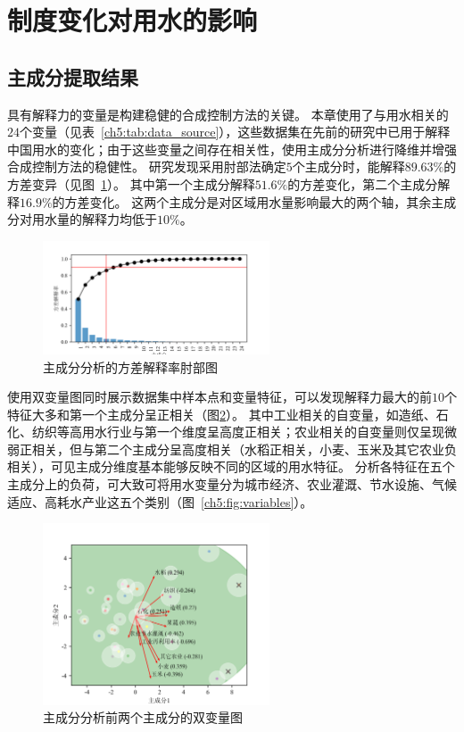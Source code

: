 

\section{制度变化对用水的影响}

\subsection{主成分提取结果}

具有解释力的变量是构建稳健的合成控制方法的关键。
本章使用了与用水相关的$24$个变量（见表~\ref{ch5:tab:data_source}），这些数据集在先前的研究中已用于解释中国用水的变化\cite{zhou2020}；由于这些变量之间存在相关性，使用主成分分析进行降维并增强合成控制方法的稳健性。
研究发现采用肘部法确定$5$个主成分时，能解释$89.63\%$的方差变异（见图~\ref{ch5:fig:elbow}）。
其中第一个主成分解释$51.6\%$的方差变化，第二个主成分解释$16.9\%$的方差变化。
这两个主成分是对区域用水量影响最大的两个轴，其余主成分对用水量的解释力均低于$10\%$。

\begin{figure}[!h]
    \centering
    \includegraphics[width=0.6\textwidth]{img/ch5/ch5_elbow.png}
    \caption{主成分分析的方差解释率肘部图}\label{ch5:fig:elbow}
\end{figure}

使用双变量图同时展示数据集中样本点和变量特征，可以发现解释力最大的前$10$个特征大多和第一个主成分呈正相关（图\ref{ch5:fig:biplot}）。
其中工业相关的自变量，如造纸、石化、纺织等高用水行业与第一个维度呈高度正相关；农业相关的自变量则仅呈现微弱正相关，但与第二个主成分呈高度相关（水稻正相关，小麦、玉米及其它农业负相关），可见主成分维度基本能够反映不同的区域的用水特征。
分析各特征在五个主成分上的负荷，可大致可将用水变量分为城市经济、农业灌溉、节水设施、气候适应、高耗水产业这五个类别（图~\ref{ch5:fig:variables}）。


\begin{figure}[!h]
    \centering
    \includegraphics[width=0.6\textwidth]{img/ch5/ch5_biplot.png}
    \caption{主成分分析前两个主成分的双变量图}\label{ch5:fig:biplot}
\end{figure}


